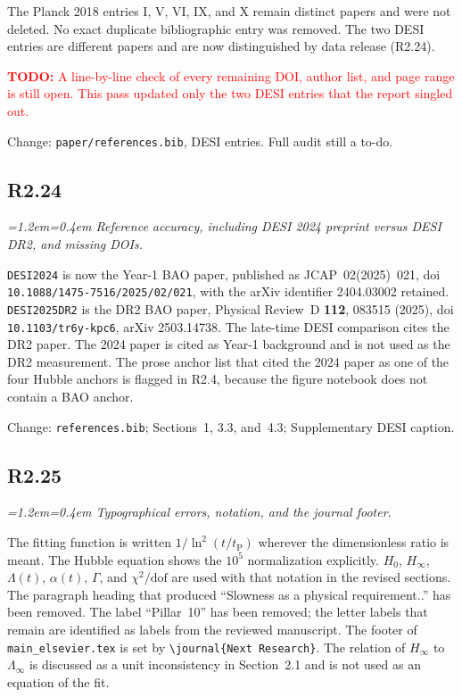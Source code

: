 \documentclass[11pt,a4paper]{article}
\newenvironment{review}{\par\color{revcolor}\itshape\leftskip=1.2em\rightskip=0.4em\noindent}{\par\leftskip=0pt\rightskip=0pt}
\newcommand{\revtodo}[1]{\textcolor{red}{\textbf{TODO:} #1}}
\begin{document}
The Planck 2018 entries I, V, VI, IX, and X remain distinct papers and were not deleted.
No exact duplicate bibliographic entry was removed.
The two DESI entries are different papers and are now distinguished by data release (R2.24).

\revtodo{A line-by-line check of every remaining DOI, author list, and page range is still open. This pass updated only the two DESI entries that the report singled out.}

Change: \texttt{paper/references.bib}, DESI entries. Full audit still a to-do.

\subsection*{R2.24}
\begin{review}
Reference accuracy, including DESI 2024 preprint versus DESI DR2, and missing DOIs.
\end{review}

\texttt{DESI2024} is now the Year-1 BAO paper, published as JCAP~02(2025)~021, doi \texttt{10.1088/1475-7516/2025/02/021}, with the arXiv identifier 2404.03002 retained.
\texttt{DESI2025DR2} is the DR2 BAO paper, Physical Review~D \textbf{112}, 083515 (2025), doi \texttt{10.1103/tr6y-kpc6}, arXiv 2503.14738.
The late-time DESI comparison cites the DR2 paper.
The 2024 paper is cited as Year-1 background and is not used as the DR2 measurement.
The prose anchor list that cited the 2024 paper as one of the four Hubble anchors is flagged in R2.4, because the figure notebook does not contain a BAO anchor.

Change: \texttt{references.bib}; Sections~1, 3.3, and~4.3; Supplementary DESI caption.

\subsection*{R2.25}
\begin{review}
Typographical errors, notation, and the journal footer.
\end{review}

The fitting function is written $1/\ln^2(t/t_{\mathrm{P}})$ wherever the dimensionless ratio is meant.
The Hubble equation shows the $10^{5}$ normalization explicitly.
$H_0$, $H_\infty$, $\Lambda(t)$, $\alpha(t)$, $\Gamma$, and $\chi^2/\mathrm{dof}$ are used with that notation in the revised sections.
The paragraph heading that produced ``Slowness as a physical requirement..'' has been removed.
The label ``Pillar~10'' has been removed; the letter labels that remain are identified as labels from the reviewed manuscript.
The footer of \texttt{main\_elsevier.tex} is set by \verb|\journal{Next Research}|.
The relation of $H_\infty$ to $\Lambda_\infty$ is discussed as a unit inconsistency in Section~2.1 and is not used as an equation of the fit.
\end{document}
